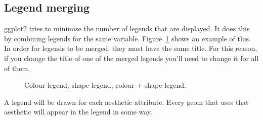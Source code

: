 \subsection{Legend merging}

ggplot2 tries to minimise the number of legends that are displayed.  It does this by combining legends for the same variable.  Figure~\ref{fig:legend-merge} shows an example of this.  In order for legends to be merged, they must have the same title.  For this reason, if you change the title of one of the merged legends you'll need to change it for all of them.

\begin{figure}[htbp]
  \centering
  \caption{Colour legend, shape legend, colour + shape legend.}
  \label{fig:legend-merge}
\end{figure}

A legend will be drawn for each aesthetic attribute.  Every geom that uses that aesthetic will appear in the legend in some way.

